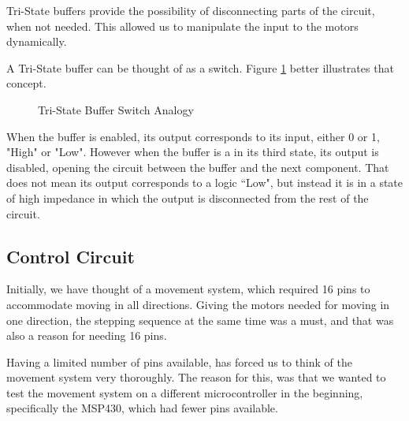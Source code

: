 Tri-State buffers provide the possibility of disconnecting parts of the circuit, when not needed.
This allowed us to manipulate the input to the motors dynamically.

A Tri-State buffer can be thought of as a switch. Figure \ref{fig:tristate} better illustrates that 
concept.
\begin{figure}[htp]
	\begin{center}
	\hspace{2cm}
	\caption{Tri-State Buffer Switch Analogy}
	\label{fig:tristate}
	\end{center}
\end{figure}


When the buffer is enabled, its output corresponds to its input, either 0 or 1, "High" or "Low".
However when the buffer is a in its third state, its output is disabled, opening the circuit 
between the buffer and the next component.
That does not mean its output corresponds to a logic “Low", but instead it is in a state of high 
impedance in which the output is disconnected from the rest of the circuit.
\newpage
\subsection{Control Circuit}\label{sub:circuit}
Initially, we have thought of a movement system, which required 16 pins to accommodate moving in 
all directions. Giving the motors needed for moving in one direction, the stepping sequence at the 
same time was a must, and that was also a reason for needing 16 pins. 

Having a limited number of pins available, has forced us to think of the movement system very 
thoroughly. The reason for this, was that we wanted to test the movement system on a different 
microcontroller in the beginning, specifically the MSP430, which had fewer pins available.


